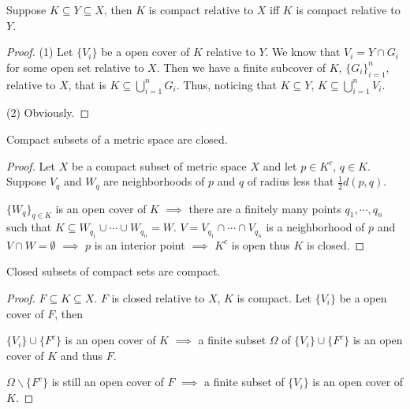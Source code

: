     \begin{theo}
        Suppose $K \subseteq Y \subseteq X$, then $K$ is compact relative to $X$ iff $K$ is compact relative to $Y$.
    \end{theo}
    \begin{framed}
        \begin{proof}
            
        (1) Let $\{V_i\}$ be a open cover of $K$ relative to $Y$. We know that $V_i = Y \cap G_i$ for some open set relative to $X$. Then we have a finite subcover of $K$, $\{G_i\}_{i=1}^n$, relative to $X$, that is $K \subseteq \bigcup_{i=1}^n G_i$. Thus, noticing that $K \subseteq Y$, $K \subseteq \bigcup_{i=1}^n V_i$.
        
        (2) Obviously.
        \end{proof}

    \end{framed}

    \begin{theo}
        Compact subsets of a metric space are closed.
    \end{theo}
    \begin{framed}
        \begin{proof}
            Let $X$ be a compact subset of metric space $X$ and let $p \in K^c$, $q \in K$. Suppose $V_q$ and $W_q$ are neighborhoods of $p$ and $q$ of radius less that $\frac{1}{2} d(p, q)$. 
            
            $\{W_q\}_{q \in K}$ is an open cover of $K$ $\implies$ there are a finitely many points $q_1, \cdots, q_n$ such that $K \subseteq W_{q_1} \cup \cdots \cup W_{q_n} = W$. $V = V_{q_1} \cap \cdots \cap V_{q_n}$ is a neighborhood of $p$ and $V \cap W = \emptyset$ $\implies$ $p$ is an interior point $\implies$ $K^c$ is open thus $K$ is closed.
        \end{proof}
    \end{framed}

    \begin{theo}
        Closed subsets of compact sets are compact.
    \end{theo}
    \begin{framed}
        \begin{proof}
            $F \subseteq K \subseteq X$. $F$ is closed relative to $X$, $K$ is compact. Let $\{V_i\}$ be a open cover of $F$, then 
            
            $\{V_i\} \cup \{F^c\}$ is an open cover of $K$ $\implies$ a finite subset $\Omega$ of $\{V_i\} \cup \{F^c\}$ is an open cover of $K$ and thus $F$. 
            
            $\Omega \backslash \{F^c\}$ is still an open cover of $F$ $\implies$ a finite subset of $\{V_i\}$ is an open cover of $K$.
        \end{proof}
    \end{framed}